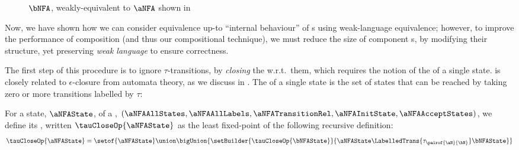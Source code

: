 \begin{figure}[ht]
    \centering
    \caption{$\bNFA$, weakly-equivalent to $\aNFA$ shown in
    }
    \label{fig:exampleTNFAWeakEquiv}
\end{figure}

Now, we have shown how we can consider equivalence up-to ``internal behaviour''
of \TNFA{}s using weak-language equivalence; however, to improve the
performance of \TNFA{} composition (and thus our compositional technique), we
must reduce the size of component \TNFA{}s, by modifying their structure, yet
preserving \emph{weak language} to ensure correctness.

The first step of this procedure is to ignore $\tau$-transitions, by
\emph{closing} the \TNFA{} w.r.t.\ them, which requires the notion of the
\tauClosure{} of a single state. \tauClosure{} is closely related to
$\epsilon$-closure from automata theory, as we discuss in
. The \tauClosure{} of a single state is the set of states
that can be reached by taking zero or more transitions labelled by $\tau$:

\begin{definition}
    For a state, $\aNFAState$, of a \NFAB{\aN}{\bN}, $( \aNFAAllStates
                                                      , \aNFAAllLabels
                                                      , \aNFATransitionRel
                                                      , \aNFAInitState
                                                      , \aNFAAcceptStates
                                                      )$, we define its
    \emph{\tauClosure{}}, written $\tauCloseOp{\aNFAState}$ as the least fixed-point of the
    following recursive definition:
    \[
        \tauCloseOp{\aNFAState} = \setof{\aNFAState} \union
        \bigUnion{\setBuilder{\tauCloseOp{\bNFAState}}{\aNFAState
        \LabelledTrans{\tau_{\pairof{\aN}{\bN}}} \bNFAState}}
    \]
\end{definition}

